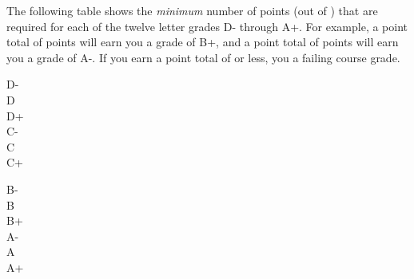 \documentclass[12pt]{article}
\newcounter{ex}\setcounter{ex}{0}
\newenvironment{mypar}[2]
  {\begin{list}{}%
    {\setlength\leftmargin{#1}
    \setlength\rightmargin{#2}}
    \item[]}
  {\end{list}}
\begin{document}





The following table shows the \emph{minimum} number of points (out of \points) that
are required for each of the twelve letter grades D- through A+. For
example, a point total of \Bp\/  points will earn you a grade of B+,  and 
a point total of \Am\/ points will earn you a grade of A-. If you earn a point
total of \F\/  or less, you a failing course grade.
 
 \vspace{0.1in}
     \begin{minipage}{5.5in}
  \centering 
\begin{mypar}{0.25in}{0.25in}
    \begin{minipage}{2.5in}
        D-  \dotfill \Dm \\
        D \dotfill \D \\
        D+ \dotfill \Dp \\
        C- \dotfill \Cm  \\
        C \dotfill \C \\
        C+ \dotfill \Cp 
        \end{minipage}
    \phantom{xxx}
    \begin{minipage}{2.5in}
        B- \dotfill \Bm \\
        B \dotfill  \B \\
        B+ \dotfill  \Bp\\
        A- \dotfill  \Am \\
        A \dotfill  \A \\
        A+ \dotfill  \Ap
    \end{minipage}
\end{mypar} 
\end{minipage}
\end{document}
